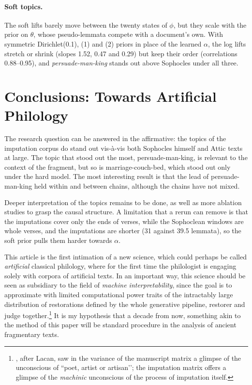 \documentclass{article}
\theoremstyle{plain}
\theoremstyle{definition}
\theoremstyle{remark}
\begin{document}
\paragraph{Soft topics.}
The soft lifts barely move between the twenty states of $\phi$, but they scale with the prior on $\theta$, whose pseudo-lemmata compete with a document's own. With symmetric Dirichlet(0.1), (1) and (2) priors in place of the learned $\alpha$, the log lifts stretch or shrink (slopes 1.52, 0.47 and 0.29) but keep their order (correlations 0.88--0.95), and \textit{persuade-man-king} stands out above Sophocles under all three.

\section{Conclusions: Towards Artificial Philology}
\label{conclusions}

The research question can be answered in the affirmative: the topics of the imputation corpus do stand out vis-à-vis both Sophocles himself and Attic texts at large. The topic that stood out the most, persuade-man-king, is relevant to the context of the fragment, but so is marriage-couch-bed, which stood out only under the hard model. The most interesting result is that the lead of persuade-man-king held within and between chains, although the chains have not mixed. 

Deeper interpretation of the topics remains to be done, as well as more ablation studies to grasp the causal structure. A limitation that a rerun can remove is that the imputations cover only the ends of verses, while the Sophoclean windows are whole verses, and the imputations are shorter (31 against 39.5 lemmata), so the soft prior pulls them harder towards $\alpha$.

This article is the first intimation of a new science, which could perhaps be called \textit{artificial} classical philology, where for the first time the philologist is engaging solely with corpora of artificial texts. In an important way, this science should be seen as subsidiary to the field of \textit{machine interpretability}, since the goal is to approximate with limited computational power traits of the intractably large distribution of restorations defined by the whole generative pipeline, restorer and judge together.\footnote{\citet[p.\ 8]{nichols1990philology}, after Lacan, saw in the variance of the manuscript matrix a glimpse of the unconscious of ``poet, artist or artisan’’; the imputation matrix offers a glimpse of the \textit{machinic} unconscious \citep{deleuze1972antioedipe} of the process of imputation itself.} It is my hypothesis that a decade from now, something akin to the method of this paper will be standard procedure in the analysis of ancient fragmentary texts.
\end{document}
